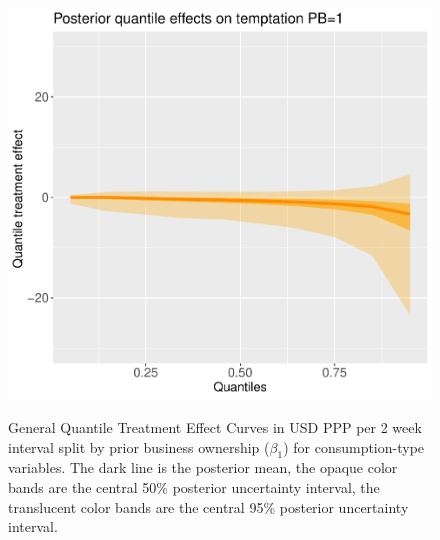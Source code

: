 \documentclass[AER]{AEA}
\begin{document}
\begin{figure}[h!]
    \includegraphics{posterior_parent_quantile_TEs_temptation_pb_1_lognormal.pdf}\\
  \caption{ General Quantile Treatment Effect Curves in USD PPP per 2 week interval split by prior business ownership ($\beta_1$) for consumption-type variables. The dark line is the posterior mean, the opaque color bands are the central 50\% posterior uncertainty interval, the translucent color bands are the central 95\% posterior uncertainty interval. } \label{consumption posterior general quantiles pb split}
\end{figure}


\end{document}

